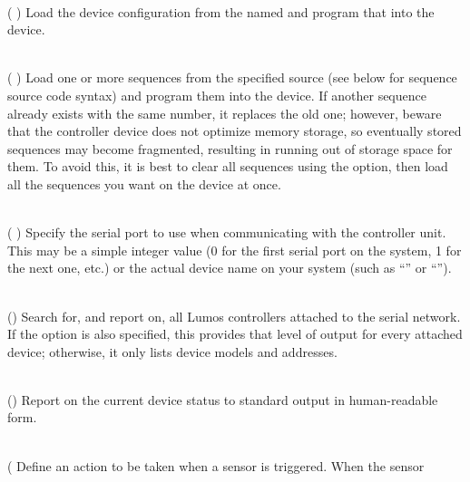 \begin{list}{}{}
\item[{\codetype{----load--configuration=}\Var*{file}}]\hfill\\
(
)
Load the device configuration from the named
and program that into the device.
\item[{\codetype{----load--sequence=}\Var*{file}}]\hfill\\
(
)
Load one or more sequences from the specified source
(see below for sequence source code syntax) and program them
into the device.  If another sequence already exists with the
same number, it replaces the old one; however, beware that the
controller device does not optimize memory storage, so eventually
stored sequences may become fragmented, resulting in running out of
storage space for them.  To avoid this, it is best to clear all
sequences using the
option, then load all the sequences you want on the device at once.
\item[{\codetype{----port=}\Var*{port}}]\hfill\\
(
)
Specify the serial port to use when communicating with the controller
unit.  This may be a simple integer value (0 for the first serial port
on the system, 1 for the next one, etc.) or the actual device name
on your system (such as 
``''
or
``'').
\item[{\codetype{----probe}}]\hfill\\
()
Search for, and report on, all Lumos controllers attached to the serial network.
If the
option is also specified, this provides that level of output for every attached
device; otherwise, it only lists device models and addresses.
\item[{\codetype{----report}}]\hfill\\
()
Report on the current device status to standard output in human-readable form.
\item[{\codetype{----sensor=}\Var*{s}\codetype{\textnormal{[}orw+\textnormal{]}:}\Var*{init}\codetype{:}\Var*{seq}\codetype{:}\Var*{term}}]\hfill\\
(
\codetype{:}\codetype{:}\codetype{\textnormal{)}}
Define an action to be taken when a sensor is triggered.  When the sensor

\end{list}
